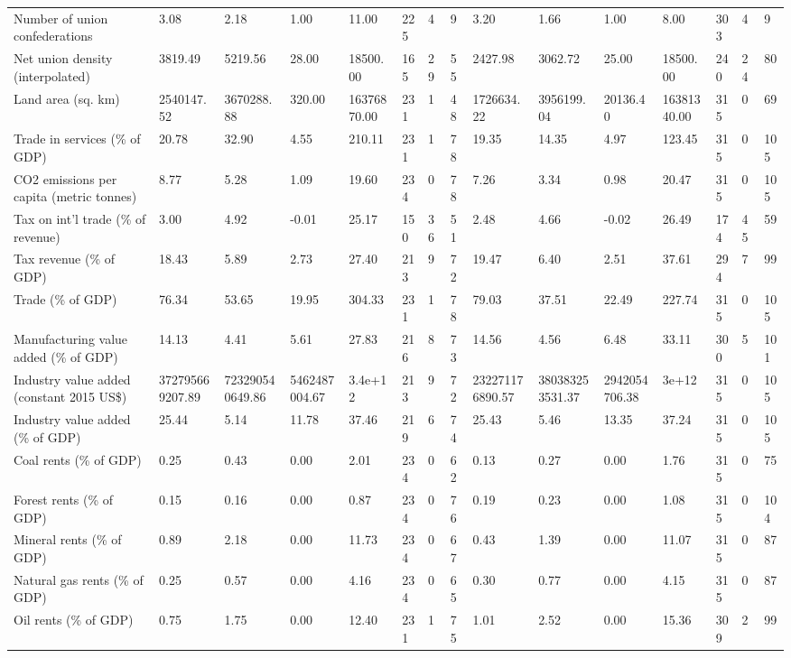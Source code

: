 \begin{longtable}{lllllllllllllll}
Number of union confederations & 3.08 & 2.18 & 1.00 & 11.00 & 225 & 4 & 9 & 3.20 & 1.66 & 1.00 & 8.00 & 303 & 4 & 9\\
Net union density (interpolated) & 3819.49 & 5219.56 & 28.00 & 18500.00 & 165 & 29 & 55 & 2427.98 & 3062.72 & 25.00 & 18500.00 & 240 & 24 & 80\\
Land area (sq. km) & 2540147.52 & 3670288.88 & 320.00 & 16376870.00 & 231 & 1 & 48 & 1726634.22 & 3956199.04 & 20136.40 & 16381340.00 & 315 & 0 & 69\\
Trade in services (\% of GDP) & 20.78 & 32.90 & 4.55 & 210.11 & 231 & 1 & 78 & 19.35 & 14.35 & 4.97 & 123.45 & 315 & 0 & 105\\
\addlinespace
CO2 emissions per capita (metric tonnes) & 8.77 & 5.28 & 1.09 & 19.60 & 234 & 0 & 78 & 7.26 & 3.34 & 0.98 & 20.47 & 315 & 0 & 105\\
Tax on int'l trade (\% of revenue) & 3.00 & 4.92 & -0.01 & 25.17 & 150 & 36 & 51 & 2.48 & 4.66 & -0.02 & 26.49 & 174 & 45 & 59\\
Tax revenue (\% of GDP) & 18.43 & 5.89 & 2.73 & 27.40 & 213 & 9 & 72 & 19.47 & 6.40 & 2.51 & 37.61 & 294 & 7 & 99\\
Trade (\% of GDP) & 76.34 & 53.65 & 19.95 & 304.33 & 231 & 1 & 78 & 79.03 & 37.51 & 22.49 & 227.74 & 315 & 0 & 105\\
Manufacturing value added (\% of GDP) & 14.13 & 4.41 & 5.61 & 27.83 & 216 & 8 & 73 & 14.56 & 4.56 & 6.48 & 33.11 & 300 & 5 & 101\\
\addlinespace
Industry value added (constant 2015 US\$) & 372795669207.89 & 723290540649.86 & 5462487004.67 & 3.4e+12 & 213 & 9 & 72 & 232271176890.57 & 380383253531.37 & 2942054706.38 & 3e+12 & 315 & 0 & 105\\
Industry value added (\% of GDP) & 25.44 & 5.14 & 11.78 & 37.46 & 219 & 6 & 74 & 25.43 & 5.46 & 13.35 & 37.24 & 315 & 0 & 105\\
Coal rents (\% of GDP) & 0.25 & 0.43 & 0.00 & 2.01 & 234 & 0 & 62 & 0.13 & 0.27 & 0.00 & 1.76 & 315 & 0 & 75\\
Forest rents (\% of GDP) & 0.15 & 0.16 & 0.00 & 0.87 & 234 & 0 & 76 & 0.19 & 0.23 & 0.00 & 1.08 & 315 & 0 & 104\\
Mineral rents (\% of GDP) & 0.89 & 2.18 & 0.00 & 11.73 & 234 & 0 & 67 & 0.43 & 1.39 & 0.00 & 11.07 & 315 & 0 & 87\\
\addlinespace
Natural gas rents (\% of GDP) & 0.25 & 0.57 & 0.00 & 4.16 & 234 & 0 & 65 & 0.30 & 0.77 & 0.00 & 4.15 & 315 & 0 & 87\\
Oil rents (\% of GDP) & 0.75 & 1.75 & 0.00 & 12.40 & 231 & 1 & 75 & 1.01 & 2.52 & 0.00 & 15.36 & 309 & 2 & 99\\

\end{longtable}
